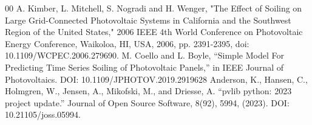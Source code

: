 \documentclass[conference]{IEEEtran}
\begin{document}
\begin{thebibliography}{00}
A. Kimber, L. Mitchell, S. Nogradi and H. Wenger, "The Effect of Soiling on Large Grid-Connected Photovoltaic Systems in California and the Southwest Region of the United States," 2006 IEEE 4th World Conference on Photovoltaic Energy Conference, Waikoloa, HI, USA, 2006, pp. 2391-2395, doi: 10.1109/WCPEC.2006.279690.
M. Coello and L. Boyle, “Simple Model For Predicting Time Series Soiling of Photovoltaic Panels,” in IEEE Journal of Photovoltaics. DOI: 10.1109/JPHOTOV.2019.2919628
Anderson, K., Hansen, C., Holmgren, W., Jensen, A., Mikofski, M., and Driesse, A. “pvlib python: 2023 project update.” Journal of Open Source Software, 8(92), 5994, (2023). DOI: 10.21105/joss.05994.
\end{thebibliography}
\end{document}
